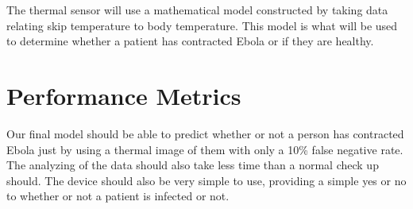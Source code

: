 \documentclass{article}
\begin{document}
The thermal sensor will use a mathematical model constructed by taking data relating skip temperature to body temperature. This model is what will be used to determine whether a patient has contracted Ebola or if they are healthy.

\section{Performance Metrics}
Our final model should be able to predict whether or not a person has contracted Ebola just by using a thermal image of them with only a 10\% false negative rate. The analyzing of the data should also take less time than a normal check up should. The device should also be very simple to use, providing a simple yes or no to whether or not a patient is infected or not.
\end{document}
